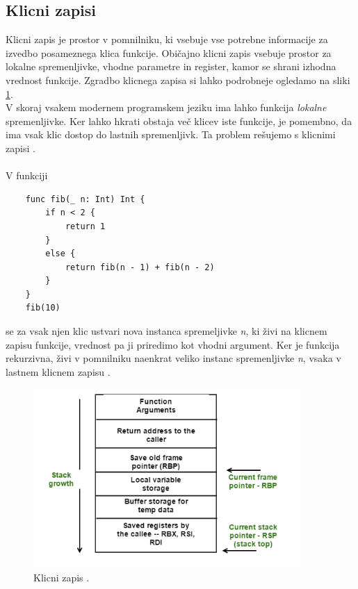 \documentclass[a4paper, 12p]{book}
\begin{document}
\subsection{Klicni zapisi}

Klicni zapis je prostor v pomnilniku, ki vsebuje vse potrebne informacije za izvedbo posameznega klica funkcije. Običajno klicni zapis vsebuje prostor za lokalne spremenljivke, vhodne parametre in register, kamor se shrani izhodna vrednost funkcije. Zgradbo klicnega zapisa si lahko podrobneje ogledamo na sliki \ref{image:stackFramesImg}. \\
\indent V skoraj vsakem modernem programskem jeziku ima lahko funkcija \textit{lokalne} spremenljivke. Ker lahko hkrati obstaja več klicev iste funkcije, je pomembno, da ima vsak klic dostop do lastnih spremenljivk. Ta problem rešujemo s klicnimi zapisi \cite{modernCompiler}.  \\\\
\indent V funkciji 

\renewcommand{\lstlistingname}{Program}
\begin{lstlisting}
	func fib(_ n: Int) Int {
	    if n < 2 {
	        return 1
	    }
	    else {
	        return fib(n - 1) + fib(n - 2)
	    }
	}
	fib(10)
\end{lstlisting}
%
se za vsak njen klic ustvari nova instanca spremeljivke \textit{n}, ki živi na klicnem zapisu funkcije, vrednost pa ji priredimo kot vhodni argument. Ker je funkcija rekurzivna, živi v pomnilniku naenkrat veliko instanc spremenljivke \textit{n}, vsaka v lastnem klicnem zapisu \cite{modernCompiler}.

\begin{figure}[h]
	\begin{center}
		\includegraphics[width=0.9\textwidth]{resources/stackFrame.png}
	\end{center}
	\caption{Klicni zapis \cite{stackFrames}.}
	\label{image:stackFramesImg}
\end{figure}
\end{document}
